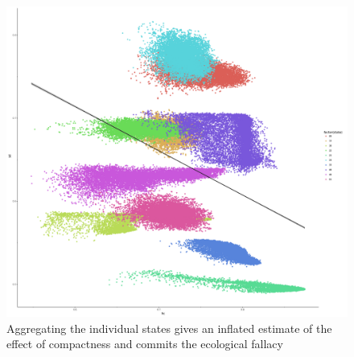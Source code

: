 \documentclass[]{article}
\begin{document}
\begin{figure}
\centering
\includegraphics{../30_results/grouped_regressions.png}
\caption{Aggregating the individual states gives an inflated estimate of
the effect of compactness and commits the ecological fallacy
\label{grouped_reg}}
\end{figure}
\end{document}
